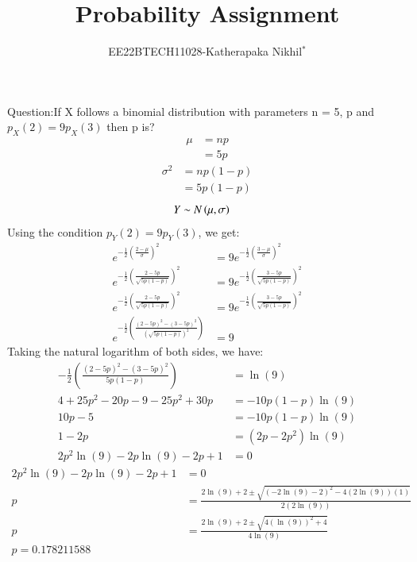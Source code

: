 \documentclass[journal,12pt,twocolumn]{IEEEtran}
\theoremstyle{remark}
\begin{document}

\vspace{3cm}

\title{Probability Assignment}
\author{EE22BTECH11028-Katherapaka Nikhil$^{*}$%
}
\maketitle
\newpage
\bigskip
\renewcommand{\thefigure}{\theenumi}
\renewcommand{\thetable}{\theenumi}

Question:If X follows a binomial distribution with parameters n = 5, p and
$p_X(2) = 9p_X(3)$
then p is?\\
\solution
\begin{align}
\mu&=np\\
&=5p
\end{align}
\begin{align}
\sigma^2&=np(1-p)\\
&=5p(1-p)
\end{align}
\begin{align}
	Y &\sim N\left(\mu,\sigma\right)
\end{align}
Using the condition \(p_Y(2) = 9p_Y(3)\), we get:
\begin{align}
e^{-\frac{1}{2}(\frac{2-\mu}{\sigma})^2} &= 9 e^{-\frac{1}{2}\left(\frac{3-\mu}{\sigma}\right)^2} \\
e^{-\frac{1}{2}\left(\frac{2 -  5p}{\sqrt{5p(1-p)}}\right)^2} &= 9 e^{-\frac{1}{2}\left(\frac{3 - 5p}{\sqrt{5p(1-p)}}\right)^2} \\
e^{-\frac{1}{2}\left(\frac{2 - 5p}{\sqrt{5p(1-p)}}\right)^2} &= 9 e^{-\frac{1}{2}\left(\frac{3 - 5p}{\sqrt{5p(1-p)}}\right)^2} \\
e^{-\frac{1}{2}\left(\frac{(2 - 5p)^2-(3 - 5p)^2}{(\sqrt{5p(1-p)})^2}\right)}&=9
\end{align}
Taking the natural logarithm of both sides, we have:
\begin{align}
-\frac{1}{2}\left(\frac{(2 - 5p)^2-(3 - 5p)^2}{5p(1-p)}\right) &= \ln(9) \\
4+25p^2-20p-9-25p^2+30p &= -10p(1-p) \ln(9) \\
10p-5 &= -10p(1-p) \ln(9) \\
1-2p &= (2p-2p^2) \ln(9) \\
2p^2\ln(9) - 2p\ln(9) - 2p + 1 &= 0 
\end{align}
\begin{align}
2p^2\ln(9) - 2p\ln(9) - 2p + 1 &= 0 \\
p &= \frac{2\ln(9) + 2 \pm \sqrt{(-2\ln(9) - 2)^2 - 4(2\ln(9))(1)}}{2(2\ln(9))} \\
p &= \frac{2\ln(9) + 2 \pm \sqrt{4(\ln(9))^2 +4}}{4\ln(9)}\\
p=0.178211588
\end{align}
\end{document}
